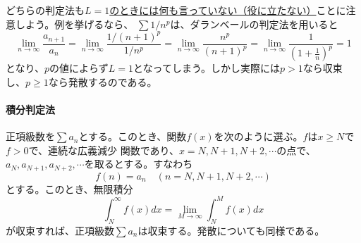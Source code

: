 \documentclass[a4j,dvipdfmx]{jsarticle}
\begin{document}
                どちらの判定法も\underline{$L=1$のときには何も言っていない（役に立たない）}ことに注意しよう。例を挙げるなら、
                $\sum 1/n^p$は、ダランベールの判定法を用いると
                \begin{equation*}
                    \lim_{n\to \infty}\frac{a_{n+1}}{a_n}=\lim_{n\to\infty}\frac{1/(n+1)^p}{1/n^p}=\lim_{n\to \infty}\frac{n^p}{(n+1)^p}=\lim_{n\to\infty}\frac{1}{\left(1+\frac{1}{n}\right)^p}=1
                \end{equation*}
                となり、$p$の値によらず$L=1$となってしまう。しかし実際には$p>1$なら収束し、$p\geq 1$なら発散するのである。

                \paragraph{積分判定法}正項級数を$\sum a_n$とする。このとき、関数$f(x)$を次のように選ぶ。$f$は$x\geq N$で$f>0$で、連続な広義減少
                関数であり、$x=N,N+1,N+2,\cdots$の点で、$a_{N},a_{N+1},a_{N+2},\cdots$を取るとする。すなわち
                \begin{equation*}
                    f(n)=a_n \quad (n=N,N+1,N+2,\cdots)
                \end{equation*}
                とする。このとき、無限積分
                \begin{equation*}
                    \int_{N}^{\infty}f(x)dx = \lim_{M\to\infty}\int_{N}^{M}f(x)dx \label{eq:積分判定法}
                \end{equation*}
                が収束すれば、正項級数$\sum a_n$は収束する。発散についても同様である。
\end{document}
